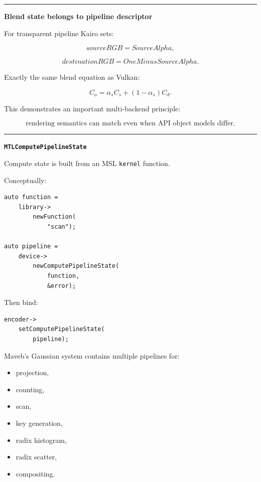 \begin{center}\rule{0.5\linewidth}{0.5pt}\end{center}

\textbf{Blend state belongs to pipeline descriptor}

For transparent pipeline Kairo sets:

\[
sourceRGB=
SourceAlpha,
\]

\[
destinationRGB=
OneMinusSourceAlpha.
\]

Exactly the same blend equation as Vulkan:

\[
C_o=
\alpha_s C_s
+
(1-\alpha_s)C_d.
\]

This demonstrates an important multi-backend principle:

\[
\boxed{
\text{rendering semantics can match even when API object models differ}.
}
\]

\begin{center}\rule{0.5\linewidth}{0.5pt}\end{center}

\textbf{\texttt{MTLComputePipelineState}}

Compute state is built from an MSL \texttt{kernel} function.

Conceptually:

\begin{verbatim}
auto function =
    library->
        newFunction(
            "scan");

auto pipeline =
    device->
        newComputePipelineState(
            function,
            &error);
\end{verbatim}

Then bind:

\begin{verbatim}
encoder->
    setComputePipelineState(
        pipeline);
\end{verbatim}

Maveb's Gaussian system contains multiple pipelines for:

\begin{itemize}
\tightlist
\item
  projection,
\item
  counting,
\item
  scan,
\item
  key generation,
\item
  radix histogram,
\item
  radix scatter,
\item
  compositing.
\end{itemize}


